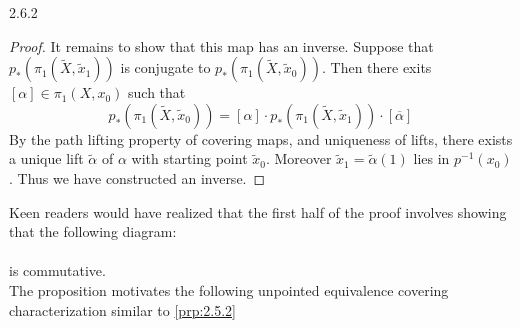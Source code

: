 \documentclass[a4paper]{article}
\begin{document}
\begin{prp}{}{2.6.2}
\begin{proof}
It remains to show that this map has an inverse. Suppose that $p_\ast(\pi_1(\widetilde{X},\widetilde{x}_1))$ is conjugate to $p_\ast(\pi_1(\widetilde{X},\widetilde{x}_0))$. Then there exits $[\alpha]\in\pi_1(X,x_0)$ such that $$p_\ast(\pi_1(\widetilde{X},\widetilde{x}_0))=[\alpha]\cdot p_\ast(\pi_1(\widetilde{X},\widetilde{x}_1))\cdot[\overline{\alpha}]$$ By the path lifting property of covering maps, and uniqueness of lifts, there exists a unique lift $\widetilde{\alpha}$ of $\alpha$ with starting point $\widetilde{x}_0$. Moreover $\widetilde{x}_1=\widetilde{\alpha}(1)$ lies in $p^{-1}(x_0)$. Thus we have constructed an inverse. 
\end{proof}
\end{prp}

Keen readers would have realized that the first half of the proof involves showing that the following diagram: \\
\\ 
is commutative. \\

The proposition motivates the following unpointed equivalence covering characterization similar to \ref{prp:2.5.2}
\end{document}
